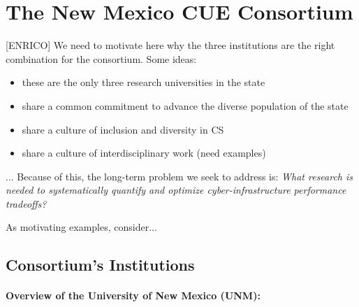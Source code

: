 \section{The New Mexico CUE Consortium}
\label{sec:consortium}


[ENRICO] We need to motivate here why the three institutions are the right combination for the consortium. Some ideas:
\begin{itemize}
    \item these are the only three research universities in the state
    \item share a common commitment to advance the diverse population of the state
    \item share a culture of inclusion and diversity in CS
    \item share a culture of interdisciplinary work (need examples)
\end{itemize}
... Because of this, the 
long-term problem we seek to address is: \emph{What research is needed to systematically 
quantify and optimize cyber-infrastructure performance tradeoffs?}

As motivating examples, consider... 


\subsection{Consortium's Institutions}

\paragraph{Overview of the University of New Mexico (UNM):}


